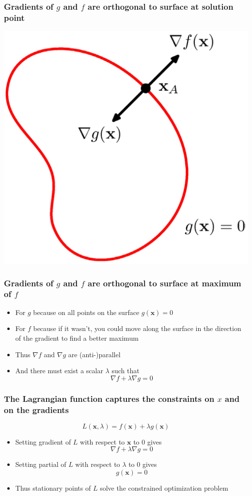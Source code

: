 \documentclass[12pt,notes,mathserif]{beamer}
\begin{document}
\begin{frame}[c]
	\frametitle{Gradients of $g$ and $f$ are orthogonal to surface at solution point}
	\begin{center}
		\includegraphics[width=0.65\linewidth]{fig8/lec827.jpg}
	\end{center}
\end{frame}



\begin{frame}[c]
	\frametitle{Gradients of $g$ and $f$ are orthogonal to surface at maximum of $f$}
	\begin{itemize}
		\item For $g$ because on all points on the surface $g(\mathbf{x})=0$
		\item For $f$ because if it wasn't, you could move along the surface in the direction of the gradient to find a better maximum
		\item Thus $\nabla f$ and $\nabla g$ are (anti-)parallel
		\item And there must exist a scalar $\lambda$ such that
		      \[
			      \nabla f+\lambda \nabla g=0
		      \]
	\end{itemize}
\end{frame}

\begin{frame}[c]
	\frametitle{The Lagrangian function captures the constraints on $x$ and on the gradients}
	\[
		L(\mathbf{x},\lambda)=f(\mathbf{x})+\lambda g(\mathbf{x})
	\]
	\begin{itemize}
		\item Setting gradient of $L$ with respect to $\mathbf{x}$ to 0 gives
		      \[
			      \nabla f+\lambda \nabla g=0
		      \]
		\item Setting partial of $L$ with respect to $\lambda$ to 0 gives
		      \[
			      g(\mathbf{x})=0
		      \]
		\item Thus stationary points of $L$ solve the constrained optimization problem
	\end{itemize}
\end{frame}
\end{document}
